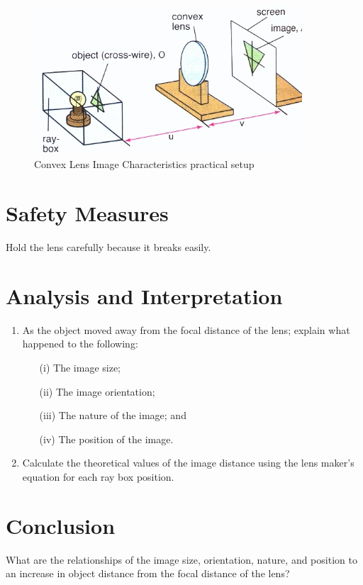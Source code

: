 \begin{figure}[h!]
\centering
\includegraphics[width=10cm]{./img/convex-lens-1.png}
\caption{Convex Lens Image Characteristics practical setup}
\label{fig:convex-lens-1}
\end{figure}

\section{Safety Measures}
Hold the lens carefully because it breaks easily.

\section{Analysis and Interpretation}
\begin{enumerate}
\item As the object moved away from the focal distance of the lens; explain what happened to the following:
\begin{itemize}
\item[(i)] The image size;
\item[(ii)] The image orientation;
\item[(iii)] The nature of the image; and
\item[(iv)] The position of the image.
\end{itemize}

\item Calculate the theoretical values of the image distance using the lens maker’s equation for each ray box position.
\end{enumerate}

\section{Conclusion}
What are the relationships of the image size, orientation, nature, and position to an increase in object distance from the focal distance of the lens? 

